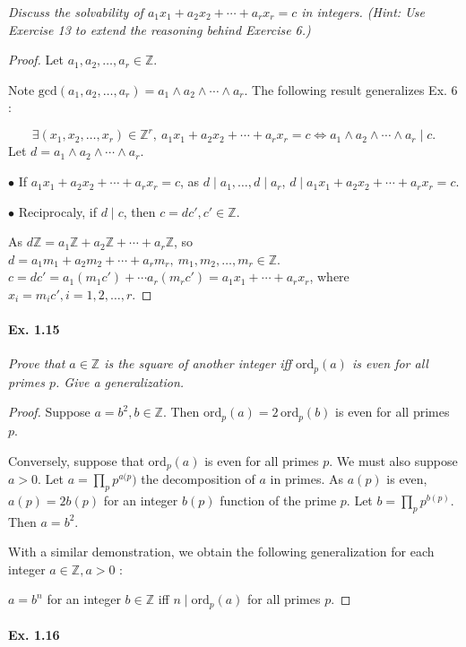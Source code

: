 \documentclass[11pt,a4paper]{article}
\newcommand{\Z}{\mathbb{Z}}
\begin{document}
{{\it Discuss the solvability of $a_1x_1+a_2x_2+\cdots + a_rx_r = c$ in integers. (Hint: Use Exercise 13 to extend the reasoning behind Exercise 6.)
}

\begin{proof}
Let $a_1,a_2,\ldots, a_r \in \Z$.

Note $\mathrm{gcd}(a_1,a_2,\ldots,a_r) = a_1\wedge a_2\wedge \cdots \wedge a_r$. The following result generalizes Ex. 6 :

$$\exists (x_1,x_2,\ldots,x_r)\in \Z^r, \  a_1x_1+a_2x_2+\cdots + a_rx_r = c\iff a_1\wedge a_2\wedge \cdots \wedge a_r \mid c.$$
Let $d = a_1\wedge a_2\wedge \cdots \wedge a_r$.

$\bullet$ If $a_1x_1+a_2x_2+\cdots + a_rx_r = c$, as $d\mid a_1,\ldots,d\mid a_r$, $d \mid a_1x_1+a_2x_2+\cdots + a_rx_r = c$.

$\bullet$ Reciprocaly, if $d \mid c$, then $c = d c', c' \in \Z$.

As $d\Z = a_1\Z+a_2\Z+\cdots+a_r\Z$, so $d = a_1 m_1+a_2m_2+\cdots+a_rm_r,\ m_1,m_2,\ldots,m_r \in \Z$.
$c = dc' = a_1(m_1c')+\cdots a_r(m_rc') = a_1x_1+\cdots + a_r x_r$, where $x_i = m_ic',i=1,2,\ldots,r$.
\end{proof}

\paragraph{Ex. 1.15}

{\it Prove that $a \in \Z$ is the square of another integer iff $\mathrm{ord}_p(a)$ is even for all primes $p$.  Give a generalization.
}

\begin{proof}
 Suppose $a = b^2, b\in \Z$. Then $\mathrm{ord}_p(a) = 2\, \mathrm{ord}_p(b)$ is even for all primes $p$.

 Conversely, suppose that $\mathrm{ord}_p(a)$ is even for all primes $p$. We must also suppose $a> 0$. Let $a =  \prod\limits_p p^{a(p})$ the decomposition of $a$ in primes. As $a(p)$ is even, $a(p) = 2 b(p)$ for an integer $b(p)$ function of the prime $p$. Let $b =  \prod\limits_p p^{b(p)}$. Then $a = b^2$.
 
 With a similar demonstration, we obtain the following generalization for each integer $a \in \Z, a > 0$ :
 
 $a = b^n$ for an integer $b \in \Z$ iff $n \mid \mathrm{ord}_p(a)$ for all primes $p$.
\end{proof}

\paragraph{Ex. 1.16}

}
\end{document}
